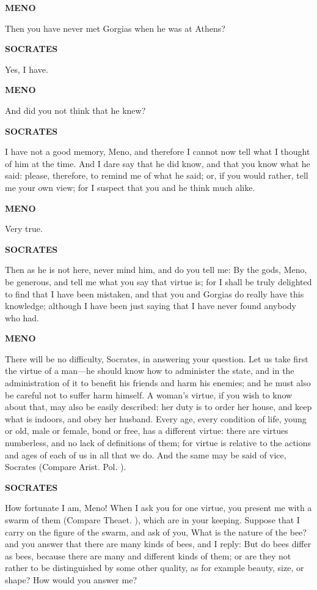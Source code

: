 \documentclass[11pt,letter]{article}
\begin{document}
\par \textbf{MENO}
\par   Then you have never met Gorgias when he was at Athens?

\par \textbf{SOCRATES}
\par   Yes, I have.

\par \textbf{MENO}
\par   And did you not think that he knew?

\par \textbf{SOCRATES}
\par   I have not a good memory, Meno, and therefore I cannot now tell what I thought of him at the time. And I dare say that he did know, and that you know what he said:  please, therefore, to remind me of what he said; or, if you would rather, tell me your own view; for I suspect that you and he think much alike.

\par \textbf{MENO}
\par   Very true.

\par \textbf{SOCRATES}
\par   Then as he is not here, never mind him, and do you tell me:  By the gods, Meno, be generous, and tell me what you say that virtue is; for I shall be truly delighted to find that I have been mistaken, and that you and Gorgias do really have this knowledge; although I have been just saying that I have never found anybody who had.

\par \textbf{MENO}
\par   There will be no difficulty, Socrates, in answering your question. Let us take first the virtue of a man—he should know how to administer the state, and in the administration of it to benefit his friends and harm his enemies; and he must also be careful not to suffer harm himself. A woman's virtue, if you wish to know about that, may also be easily described:  her duty is to order her house, and keep what is indoors, and obey her husband. Every age, every condition of life, young or old, male or female, bond or free, has a different virtue:  there are virtues numberless, and no lack of definitions of them; for virtue is relative to the actions and ages of each of us in all that we do. And the same may be said of vice, Socrates (Compare Arist. Pol. ).

\par \textbf{SOCRATES}
\par   How fortunate I am, Meno! When I ask you for one virtue, you present me with a swarm of them (Compare Theaet. ), which are in your keeping. Suppose that I carry on the figure of the swarm, and ask of you, What is the nature of the bee? and you answer that there are many kinds of bees, and I reply:  But do bees differ as bees, because there are many and different kinds of them; or are they not rather to be distinguished by some other quality, as for example beauty, size, or shape? How would you answer me?
\end{document}
